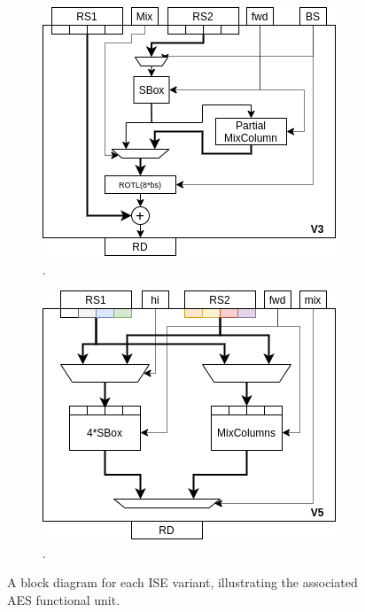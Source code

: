 \begin{figure}[t]
\begin{subfigure}[t]{0.40\textwidth}
    \centering
    \includegraphics[width=\textwidth]{diagrams/ise-datapath-v3.png}
    \caption{.}
    \label{fig:ise:design:v3}
\end{subfigure}
\begin{subfigure}[t]{0.40\textwidth}
    \centering
    \includegraphics[width=\textwidth]{diagrams/ise-datapath-v5.png}
    \caption{.}
    \label{fig:ise:design:v5}
\end{subfigure}
\caption{
A block diagram for each ISE variant, illustrating the associated AES functional unit.
}
\label{fig:ise:design}
\end{figure}

